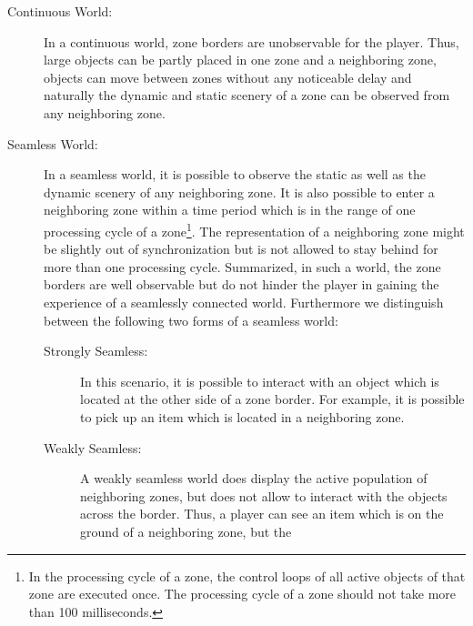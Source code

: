 \documentclass[a4paper, 10pt]{book}
\begin{document}
            \begin{description}
                \item[Continuous World:] In a continuous world, zone borders are
                    unobservable for the player. Thus, large objects can be partly
                    placed in one zone and a neighboring zone, objects can move between
                    zones without any noticeable delay and naturally the dynamic and
                    static scenery of a zone can be observed from any neighboring zone.
                \item[Seamless World:] In a seamless world, it is possible to observe
                    the static as well as the dynamic scenery of any neighboring zone.
                    It is also possible to enter a neighboring zone within a time period
                    which is in the range of one processing cycle of a zone\footnote{In
                    the processing cycle of a zone, the control loops of all active
                    objects of that zone are executed once. The processing cycle of a
                    zone should not take more than 100 milliseconds.}. The
                    representation of a neighboring zone might be slightly out of
                    synchronization but is not allowed to stay behind for more than one
                    processing cycle.
                    Summarized, in such a world, the zone borders are well observable
                    but do not hinder the player in gaining the experience of a
                    seamlessly connected world.
                    Furthermore we distinguish between the following two forms of a
                    seamless world:
                    \begin{description}
                        \item[Strongly Seamless:] In this scenario, it is possible to
                            interact with an object which is located at the other side of a
                            zone border. For example, it is possible to pick up an item which
                            is located in a neighboring zone. 
                        \item[Weakly Seamless:] A weakly seamless world does display the
                            active population of neighboring zones, but does not allow to
                            interact with the objects across the border. Thus, a player can
                            see an item which is on the ground of a neighboring zone, but the

\end{description}
\end{description}
\end{document}
